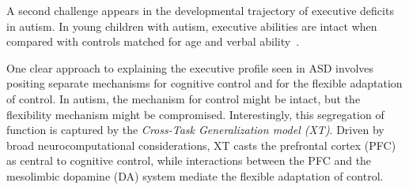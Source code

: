 A second challenge appears in the developmental trajectory of
executive deficits in autism.  In young children with autism,
executive abilities are intact when compared with controls matched for
age and verbal ability~\cite{GriffithEM:1999:AutismYoungED}.

One clear approach to explaining the executive profile seen in ASD
involves positing separate mechanisms for cognitive control and for
the flexible adaptation of control.  In autism, the mechanism for
control might be intact, but the flexibility mechanism 
might be compromised.  Interestingly, this segregation of function is captured by the 
\emph{Cross-Task Generalization model (XT)}.  Driven by broad
neurocomputational considerations, XT casts the prefrontal cortex
(PFC) as central to cognitive control, while interactions between the
PFC and the mesolimbic dopamine (DA) system mediate the flexible
adaptation of control.  


 
